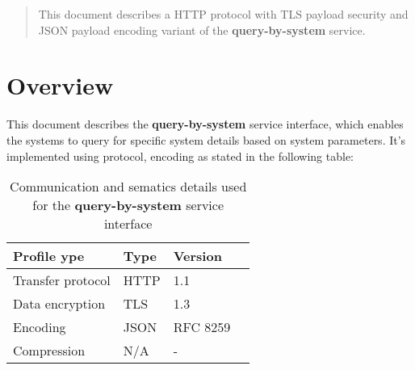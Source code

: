 \documentclass[a4paper]{arrowhead}
\begin{document}
\ArrowheadDate{\today}
\ArrowheadSetup

\begin{center}
  \vspace*{1cm}
  \huge{\arrowtitle}

  \vspace*{0.2cm}
  \LARGE{\arrowtype}
  \vspace*{1cm}
\end{center}

  \vspace*{\fill}


  \vspace*{1cm}
  \vspace*{\fill}

  \begin{abstract}
    This document describes a HTTP protocol with TLS payload
    security and JSON payload encoding variant of the \textbf{query-by-system} service.
  \end{abstract}
  \vspace*{1cm}

\newpage

\tableofcontents
\newpage

\section{Overview}
\label{sec:overview}

This document describes the \textbf{query-by-system} service interface, which enables the systems to query for specific system details based on system parameters. It's implemented using protocol, encoding as stated in the following table:

\begin{table}[ht!]
  \centering
  \begin{tabular}{|l|l|l|l|}
    \rowcolor{gray!33} Profile ype & Type & Version \\ \hline
    Transfer protocol & HTTP & 1.1 \\ \hline
    Data encryption & TLS & 1.3 \\ \hline
    Encoding & JSON & RFC 8259 \cite{rfc8259} \\ \hline
    Compression & N/A & - \\ \hline
  \end{tabular}
  \caption{Communication and sematics details used for the \textbf{query-by-system}
    service interface}
  \label{tab:comunication_semantics_profile}
\end{table}
\end{document}
